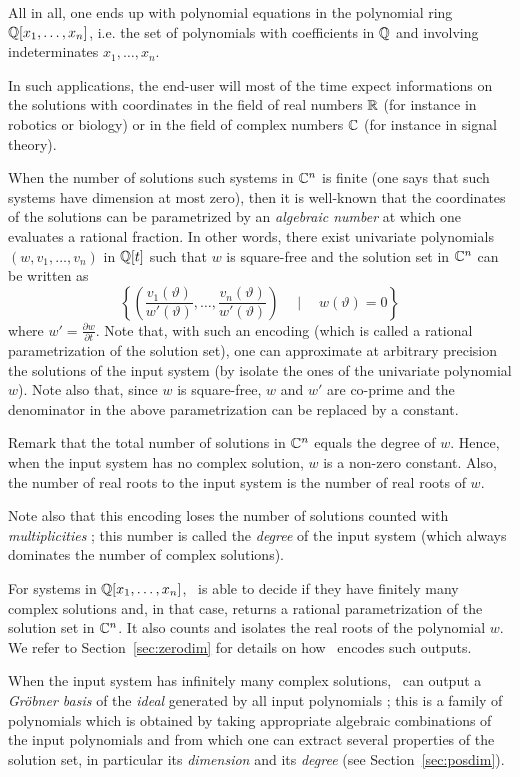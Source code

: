 \documentclass[a4paper,english,11pt]{scrartcl}
\theoremstyle{definition}
\theoremstyle{remark}
\begin{document}
All in all, one ends up with polynomial equations in the polynomial ring
$\mathbb{Q}[x_1, \ldots, x_n]$, i.e. the set of polynomials with coefficients in $\mathbb{Q}$
and involving indeterminates $x_1, \ldots, x_n$.

In such applications, the end-user will most of the time expect informations on
the solutions with coordinates in the field of real numbers $\mathbb{R}$ (for instance
in robotics or biology) or in the field of complex numbers $\mathbb{C}$ (for instance in
signal theory).

When the number of solutions such systems in $\mathbb{C}^n$ is finite (one says that
such systems have dimension at most zero), then it is well-known that the
coordinates of the solutions can be parametrized by an \emph{algebraic number}
at which one evaluates a rational fraction. In other words, there exist
univariate polynomials $(w, v_1, \ldots, v_n)$ in $\mathbb{Q}[t]$ such that $w$ is
square-free and the solution set in $\mathbb{C}^n$ can be written as
\[
  \left \{
  \left (\frac{v_1(\vartheta)}{w'(\vartheta)}, \ldots,
  \frac{v_n(\vartheta)}{w'(\vartheta)}\right ) \quad \mid \quad w(\vartheta) = 0
\right \}
\]
where $w'=\frac{\partial w}{\partial t}$. Note that, with such an encoding
(which is called a rational parametrization of the solution set), one can
approximate at arbitrary precision the solutions of the input system (by isolate
the ones of the univariate polynomial $w$).
Note also that, since $w$ is square-free, $w$ and $w'$ are co-prime and the
denominator in the above parametrization can be replaced by a constant.

Remark that the total number of solutions in $\mathbb{C}^n$ equals the degree of $w$.
Hence, when the input system has no complex solution, $w$ is a non-zero
constant. Also, the number of real roots to the input system is the number of
real roots of $w$.

Note also that this encoding loses the number of solutions counted with
\emph{multiplicities} ; this number is called the \emph{degree} of the input
system (which always dominates the number of complex solutions). 

For systems in $\mathbb{Q}[x_1, \ldots, x_n]$, \msolve~is able to decide if they have
finitely many complex solutions and, in that case, returns a rational
parametrization of the solution set in $\mathbb{C}^n$. It also counts and isolates the
real roots of the polynomial $w$. We refer to Section~\ref{sec:zerodim} for
details on how \msolve~encodes such outputs.

When the input system has infinitely many complex solutions, \msolve~can output
a \emph{Gr\"obner basis} of the \emph{ideal} generated by all input polynomials
; this is a family of polynomials which is obtained by taking appropriate
algebraic combinations of the input polynomials and from which one can extract
several properties of the solution set, in particular its \emph{dimension} and
its \emph{degree} (see Section~\ref{sec:posdim}). 
\end{document}
